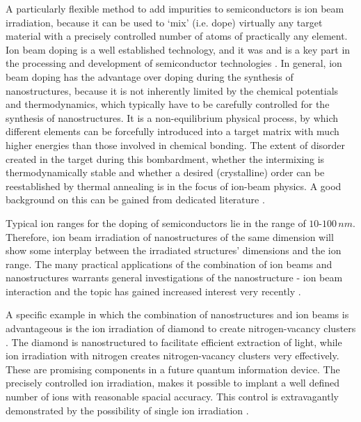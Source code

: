 A particularly flexible method to add impurities to semiconductors is ion beam irradiation, because it can be used to `mix' (i.e. dope) virtually any target material with a precisely controlled number of atoms of practically any element. Ion beam doping is a well established technology, and it was and is a key part in the processing and development of semiconductor technologies \cite{hamm_industrial_2012}. In general, ion beam doping has the advantage over doping during the synthesis of nanostructures, because it is not inherently limited by the chemical potentials and thermodynamics, which typically have to be carefully controlled for the synthesis of nanostructures. It is a non-equilibrium physical process, by which different elements can be forcefully introduced into a target matrix with much higher energies than those involved in chemical bonding. The extent of disorder created in the target during this bombardment, whether the intermixing is thermodynamically stable and whether a desired (crystalline) order can be reestablished by thermal annealing is in the focus of ion-beam physics. A good background on this can be gained from dedicated literature \cite{ziegler_stopping_1985,eckstein_computer_1991,nastasi/mayer/hirvonen_ion-solid_2008,schmidt_ion_2012}.


Typical ion ranges for the doping of semiconductors lie in the range of $10$-$100\,nm$. Therefore, ion beam irradiation of nanostructures of the same dimension will show some interplay between the irradiated structures' dimensions and the ion range. The many practical applications of the combination of ion beams and nanostructures warrants general investigations of the nanostructure - ion beam interaction and the topic has gained increased interest very recently \cite{borschel_ion-solid_2012,greaves_enhanced_2013,nietiadi_sputtering_2014,johannes_ion_2015,urbassek_sputter_2015}.  

A specific example in which the combination of nanostructures and ion beams is advantageous is the ion irradiation of diamond to create nitrogen-vacancy clusters \cite{babinec_diamond_2010}. The diamond is nanostructured to facilitate efficient extraction of light, while ion irradiation with nitrogen creates nitrogen-vacancy clusters very effectively. These are promising components in a future quantum information device. The precisely controlled ion irradiation, makes it possible to implant a well defined number of ions with reasonable spacial accuracy. This control is extravagantly demonstrated by the possibility of single ion irradiation \cite{meijer_concept_2006,ohdomari_single-ion_2008}. 

